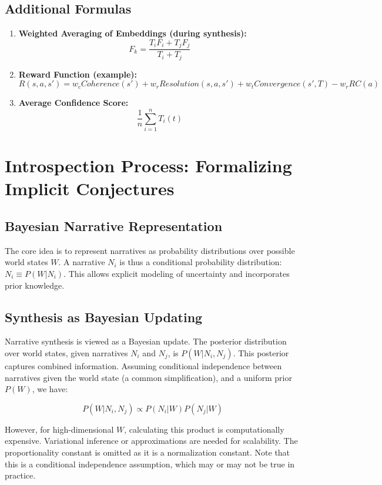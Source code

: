 \documentclass[12pt, a4paper]{article}
\begin{document}
\subsection{Additional Formulas}

\begin{enumerate}
    \item \textbf{Weighted Averaging of Embeddings (during synthesis): }
    \[
    F_k = \frac{T_i F_i + T_j F_j}{T_i + T_j}
    \]
    \item \textbf{Reward Function (example): }
    \[
    R(s, a, s') = w_c Coherence(s') + w_r Resolution(s, a, s') + w_t Convergence(s', T) - w_r RC(a)
    \]
    \item \textbf{Average Confidence Score: }
    \[
    \frac{1}{n} \sum_{i=1}^n T_i(t)
    \]
\end{enumerate}
 







\section{Introspection Process: Formalizing Implicit Conjectures}

\subsection{Bayesian Narrative Representation}

The core idea is to represent narratives as probability distributions over possible world states $W$.  A narrative $N_i$ is thus a conditional probability distribution: $N_i \equiv P(W|N_i)$. This allows explicit modeling of uncertainty and incorporates prior knowledge.

\subsection{Synthesis as Bayesian Updating}

Narrative synthesis is viewed as a Bayesian update. The posterior distribution over world states, given narratives $N_i$ and $N_j$, is $P(W|N_i, N_j)$. This posterior captures combined information. Assuming conditional independence between narratives given the world state (a common simplification), and a uniform prior $P(W)$, we have:

\[
P(W|N_i, N_j) \propto P(N_i|W)P(N_j|W)
\]

However, for high-dimensional $W$, calculating this product is computationally expensive. Variational inference or approximations are needed for scalability.  The proportionality constant is omitted as it is a normalization constant. Note that this is a conditional independence assumption, which may or may not be true in practice.
\end{document}
